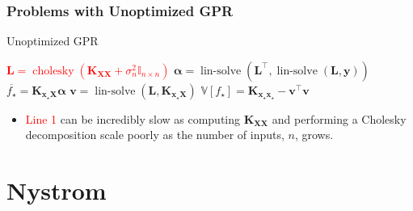 \documentclass[9pt,hyperref={pdfpagelabels=false},xcolor=table]{beamer}
\begin{document}
\begin{frame}
    \frametitle{Problems with Unoptimized GPR}
    {\centering
        \begin{minipage}{.9\linewidth}
            \begin{algorithm}[H]
                \caption{Unoptimized GPR}
                \SetAlgoLined
                \DontPrintSemicolon

                \BlankLine
                \textcolor{red}{$\bm{L} = \operatorname{cholesky} \left( \bm{K_{XX}} + \sigma_n^2 \mathbb{I}_{n \times n} \right)$}\;
                $\bm{\alpha} = \operatorname{lin-solve} \left( \bm{L}^{\intercal} , \operatorname{lin-solve} \left( \bm{L}, \bm{y} \right) \right)$\;
                $\overline{f_{\star}} = \bm{K_{x_{\star} X}} \bm{\alpha}$\;
                $\bm{v} = \operatorname{lin-solve} \left( \bm{L}, \bm{K_{x_{\star} X}} \right)$\;
                $\mathbb{V} \left[ f_{\star} \right] = \bm{K_{x_{\star} x_{\star}}} - \bm{v}^{\intercal} \bm{v}$\;
                \BlankLine
            \end{algorithm}
        \end{minipage}
        \par
    }
    \begin{itemize}
        \item \textcolor{red}{Line 1} can be incredibly slow as computing $\bm{K_{XX}}$ and performing a Cholesky decomposition scale poorly as the number of inputs, $n$, grows.
    \end{itemize}
\end{frame}

\section{Nystrom}
\end{document}
